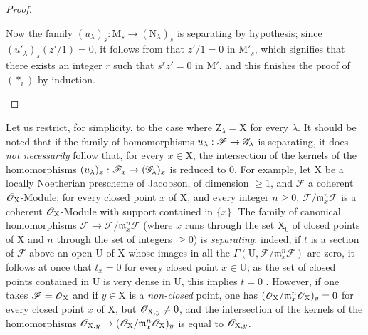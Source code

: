 \begin{proof}
\begin{enumerate}[label=(\roman*)]
  Now the family $(u_\lambda)_s:\mathrm{M}_s\to(\mathrm{N}_\lambda)_s$ is separating by hypothesis; since $(u'_\lambda)_s(z'/1)=0$, it follows from  that $z'/1=0$ in $\mathrm{M}'_s$, which signifies that there exists an integer $r$ such that $s^r z'=0$ in $\mathrm{M}'$, and this finishes the proof of $(*_i)$ by induction.
\end{enumerate}
\end{proof}

\begin{remark}[11.9.11]
\label{IV.11.9.11}
Let us restrict, for simplicity, to the case where $\mathrm{Z}_\lambda=\mathrm{X}$ for every $\lambda$.
It should be noted that if the family of homomorphisms $u_\lambda:\mathscr{F}\to\mathscr{G}_\lambda$ is separating, it does \emph{not necessarily} follow that, for every $x\in\mathrm{X}$, the intersection of the kernels of the homomorphisms $(u_\lambda)_x:\mathscr{F}_x\to(\mathscr{G}_\lambda)_x$ is reduced to $0$.
For example, let $\mathrm{X}$ be a locally Noetherian prescheme of Jacobson, of dimension $\geq 1$, and $\mathscr{F}$ a coherent $\mathscr{O}_\mathrm{X}$-Module; for every closed point $x$ of $\mathrm{X}$, and every integer $n\geq 0$, $\mathscr{F}/\mathfrak{m}_x^n\mathscr{F}$ is a coherent $\mathscr{O}_\mathrm{X}$-Module with support contained in $\{x\}$.
The family of canonical homomorphisms $\mathscr{F}\to\mathscr{F}/\mathfrak{m}_x^n\mathscr{F}$ (where $x$ runs through the set $\mathrm{X}_0$ of closed points of $\mathrm{X}$ and $n$ through the set of integers $\geq 0$) is \emph{separating}: indeed, if $t$ is a section of $\mathscr{F}$ above an open $\mathrm{U}$ of $\mathrm{X}$ whose images in all the $\Gamma(\mathrm{U},\mathscr{F}/\mathfrak{m}_x^n\mathscr{F})$ are zero, it follows at once that $t_x=0$ for every closed point $x\in\mathrm{U}$; as the set of closed points contained in $\mathrm{U}$ is very dense in $\mathrm{U}$, this implies $t=0$ .
However, if one takes $\mathscr{F}=\mathscr{O}_\mathrm{X}$ and if $y\in\mathrm{X}$ is a \emph{non-closed} point, one has $(\mathscr{O}_\mathrm{X}/\mathfrak{m}_x^n\mathscr{O}_\mathrm{X})_y=0$ for every closed point $x$ of $\mathrm{X}$, but $\mathscr{O}_{\mathrm{X},y}\neq 0$, and the intersection of the kernels of the homomorphisms $\mathscr{O}_{\mathrm{X},y}\to(\mathscr{O}_\mathrm{X}/\mathfrak{m}_x^n\mathscr{O}_\mathrm{X})_y$ is equal to $\mathscr{O}_{\mathrm{X},y}$.
\end{remark}

